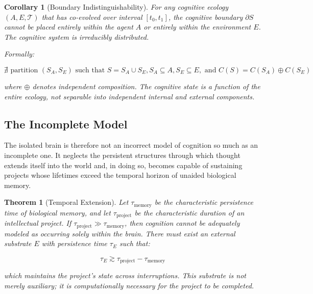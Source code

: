 \documentclass[12pt,oneside]{article}
\newtheorem{theorem}[definition]{Theorem}
\newtheorem{corollary}[definition]{Corollary}
\theoremstyle{remark}
\begin{document}
\begin{corollary}[Boundary Indistinguishability]
For any cognitive ecology $(A, E, \mathcal{T})$ that has co-evolved over interval $[t_0, t_1]$, the cognitive boundary $\partial S$ cannot be placed entirely within the agent $A$ or entirely within the environment $E$. The cognitive system is irreducibly distributed.

Formally:

\begin{equation}
\nexists \text{ partition } (S_A, S_E) \text{ such that } S = S_A \cup S_E, S_A \subseteq A, S_E \subseteq E, \text{ and } C(S) = C(S_A) \oplus C(S_E)
\end{equation}

where $\oplus$ denotes independent composition. The cognitive state is a function of the entire ecology, not separable into independent internal and external components.
\end{corollary}

\subsection{The Incomplete Model}

The isolated brain is therefore not an incorrect model of cognition so much as an incomplete one. It neglects the persistent structures through which thought extends itself into the world and, in doing so, becomes capable of sustaining projects whose lifetimes exceed the temporal horizon of unaided biological memory.

\begin{theorem}[Temporal Extension]
Let $\tau_{\text{memory}}$ be the characteristic persistence time of biological memory, and let $\tau_{\text{project}}$ be the characteristic duration of an intellectual project. If $\tau_{\text{project}} \gg \tau_{\text{memory}}$, then cognition cannot be adequately modeled as occurring solely within the brain. There must exist an external substrate $E$ with persistence time $\tau_E$ such that:

\begin{equation}
\tau_E \gtrsim \tau_{\text{project}} - \tau_{\text{memory}}
\end{equation}

which maintains the project's state across interruptions. This substrate is not merely auxiliary; it is computationally necessary for the project to be completed.
\end{theorem}
\end{document}
